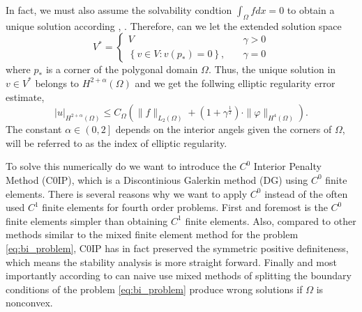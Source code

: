In fact, we must also assume the solvability condtion $ \int_{\Omega }^{} f dx = 0$ to obtain a unique solution according  \cite{brenner2012}, \cite{gu2012c0}. Therefore, can we let the extended solution space \[
V^{*} = \begin{cases}
    V \quad & \gamma > 0 \\
    \left\{ v \in V: v\left( p_{*} \right)  = 0\right\}, \quad & \gamma = 0
\end{cases}
\]
where $p_{*}$ is a corner of the polygonal domain $\Omega $.
Thus, the unique solution in $v \in V^{*}$ belongs to $H^{2 + \alpha }\left( \Omega  \right) $ and we get the follwing
elliptic regularity error estimate,
\begin{equation}
\label{eq:bi_harmonic_ellitpic_regularity}
\left| u \right| _{H^{2 + \alpha }\left( \Omega  \right) }  \le C_{\Omega } \left( \| f \|_{  L_{2}( \Omega ) }^{  } + ( 1 + \gamma ^{\frac{1}{2}}
) \cdot \| \varphi  \|_{ H^{4}\left( \Omega  \right)  }^{  }    \right).
\end{equation}
The constant $\alpha \in \left( 0,2\right] $ depends on the interior angels given the corners of $\Omega $, will be referred to as the index of
elliptic regularity.

To solve this numerically do we want to introduce the $C^{0}$ Interior Penalty Method (C0IP), which is a Discontinious Galerkin
method (DG) using $C^{0}$ finite elements. There is several reasons why we want to apply $C^{0}$ instead of the often used
$C^{1}$ finite elements for fourth order problems. First and foremost is the $C^0$ finite elements simpler than
obtaining $C^{1}$ finite elements.  Also, compared to other methods similar to the mixed
finite element method for the problem \eqref{eq:bi_problem}, C0IP has in fact
preserved the symmetric positive definiteness, which means the stability analysis is more straight forward. Finally and most
importantly according to \cite{brenner2012quadratic} can naive use mixed methods of splitting the boundary conditions of
the problem \eqref{eq:bi_problem} produce wrong solutions if $\Omega $ is nonconvex.


